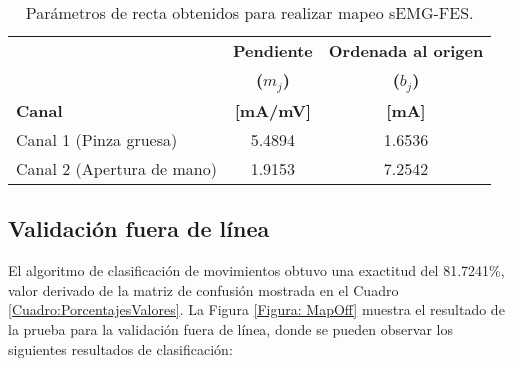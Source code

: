 \begin{table}[htbp]
	\centering
	\begin{tabular}{|l|c|c|}
	\hline
	\textbf{} & \textbf{Pendiente} & \textbf{Ordenada al origen}\\ 
	\textbf{} & \textbf{($m_{j}$)} & \textbf{($b_{j}$)}\\
	\textbf{Canal} & \textbf{[mA/mV]} & \textbf{[mA]}\\\hline \hline
	Canal 1 (Pinza gruesa) & 5.4894 & 1.6536\\ \hline
	Canal 2 (Apertura de mano) & 1.9153 & 7.2542\\ \hline
	\end{tabular}
	\caption{Parámetros de recta obtenidos para realizar mapeo sEMG-FES.}
	\label{Cuadro:Rectas}
\end{table}


\newpage
\subsection{Validación fuera de línea}
El algoritmo de clasificación de movimientos obtuvo una exactitud del 81.7241\%, valor derivado de la matriz de confusión mostrada en el Cuadro \ref{Cuadro:PorcentajesValores}. La Figura \ref{Figura: MapOff} muestra el resultado de la prueba para la validación fuera de línea, donde se pueden observar los siguientes resultados de clasificación:

